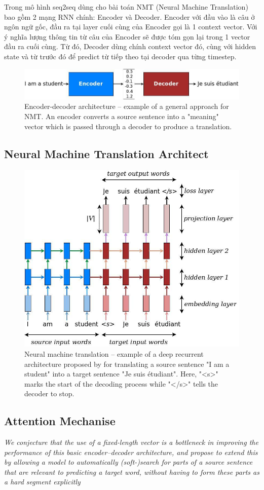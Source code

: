\documentclass[preprint,12pt]{elsarticle}
\begin{document}
Trong mô hình seq2seq dùng cho bài toán NMT (Neural Machine Translation) bao gồm 2 mạng RNN chính: Encoder và Decoder. Encoder với đầu vào là câu ở ngôn ngữ gốc, đầu ra tại layer cuối cùng của Encoder gọi là 1 context vector. Với ý nghĩa lượng thông tin từ câu của Encoder sẽ được tóm gọn lại trong 1 vector đầu ra cuối cùng. Từ đó, Decoder dùng chính context vector đó, cùng với hidden state và từ trước đó để predict từ tiếp theo tại decoder qua từng timestep.

\begin{figure}[h]
\centering\includegraphics[width=0.4\linewidth]{img/encdec.jpg}
\caption{Encoder-decoder architecture – example of a general approach for NMT. An encoder converts a source sentence into a "meaning" vector which is passed through a decoder to produce a translation.}
\end{figure}

\subsection{Neural Machine Translation Architect}

\begin{figure}[h]
\centering\includegraphics[width=0.4\linewidth]{img/seq2seq.jpg}
\caption{Neural machine translation – example of a deep recurrent architecture proposed by for translating a source sentence "I am a student" into a target sentence "Je suis étudiant". Here, "<s>" marks the start of the decoding process while "</s>" tells the decoder to stop.}
\end{figure}

\subsection{Attention Mechanise}

\textit{We conjecture that the use of a fixed-length vector is a
bottleneck in improving the performance of this basic encoder–decoder architecture, and propose to extend this by allowing a model to automatically (soft-)search for parts of a source sentence that are relevant to predicting a target word, without having to form these parts as a hard segment explicitly\cite{Bahdanau:2015}}
\end{document}
